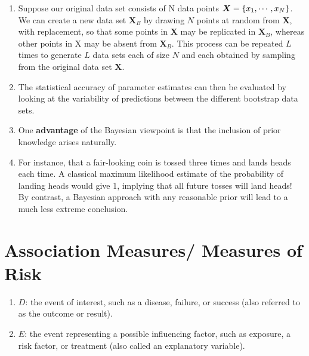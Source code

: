 \begin{enumerate}
    \item Suppose our original data set consists of N data points $\bm{X} = \left\{x_1, \cdots , x_N \right\}$.
    We can create a new data set $\bm{X}_B$ by drawing $N$ points at random from $\bm{X}$, with replacement, so that some points in $\bm{X}$ may be replicated in $\bm{X}_B$, whereas other points in X may be absent from $\bm{X}_B$.
    This process can be repeated $L$ times to generate $L$ data sets each of size $N$ and each obtained by sampling from the original data set $\bm{X}$.
    \hfill \cite{ml/book/Pattern-Recognition-And-Machine-Learning/Christopher-M-Bishop}

    \item The statistical accuracy of parameter estimates can then be evaluated by looking at the variability of predictions between the different bootstrap data sets.
    \hfill \cite{ml/book/Pattern-Recognition-And-Machine-Learning/Christopher-M-Bishop}

    \item One \textbf{advantage} of the Bayesian viewpoint is that the inclusion of prior knowledge arises naturally.
    \hfill \cite{ml/book/Pattern-Recognition-And-Machine-Learning/Christopher-M-Bishop}

    \item For instance, that a fair-looking coin is tossed three times and lands heads each time.
    A classical maximum likelihood estimate of the probability of landing heads would give 1, implying that all future tosses will land heads!
    By contrast, a Bayesian approach with any reasonable prior will lead to a much less extreme conclusion.
    \hfill \cite{ml/book/Pattern-Recognition-And-Machine-Learning/Christopher-M-Bishop}


\end{enumerate}











\section{Association Measures/ Measures of Risk}

\begin{enumerate}
    \item $D$: the event of interest, such as a disease, failure, or success (also referred to as the outcome or result).
    \hfill \cite{statistics/book/Statistics-for-Data-Scientists/Maurits-Kaptein, common/online/chatgpt}

    \item $E$: the event representing a possible influencing factor, such as exposure, a risk factor, or treatment (also called an explanatory variable).
    \hfill \cite{statistics/book/Statistics-for-Data-Scientists/Maurits-Kaptein, common/online/chatgpt}
\end{enumerate}

